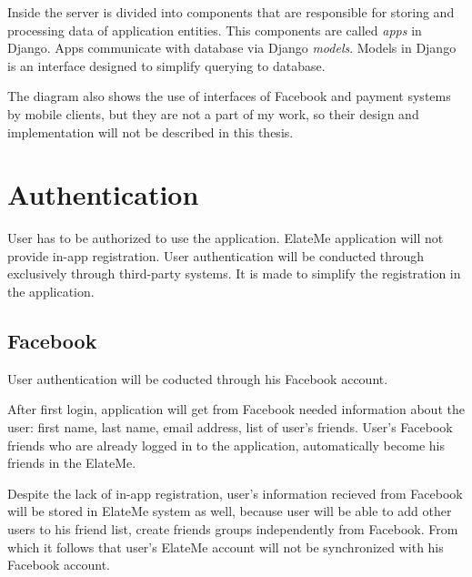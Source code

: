 Inside the server is divided into components that are responsible for storing and processing data of application
entities. This components are called \textit{apps} in Django. Apps communicate with database via Django \textit{models}.
Models in Django is an interface designed to simplify querying to database.


The diagram also shows the use of interfaces of Facebook and payment systems by mobile clients, but they are not a part
of my work, so their design and implementation will not be described in this thesis.



\section{Authentication}
User has to be authorized to use the application. ElateMe application will not provide in-app registration. User
authentication will be conducted through exclusively through third-party systems. It is made to simplify the
registration in the application.


\subsection{Facebook}
User authentication will be coducted through his Facebook account.

After first login, application will get from Facebook needed information about the user: first name, last name,
email address, list of user's friends. User's Facebook friends who are already logged in to the application,
automatically become his friends in the ElateMe.

Despite the lack of in-app registration, user's information recieved from Facebook will be stored in ElateMe system
as well, because user will be able to add other users to his friend list, create friends groups independently from
Facebook. From which it follows that user's ElateMe account will not be synchronized with his Facebook account.

















